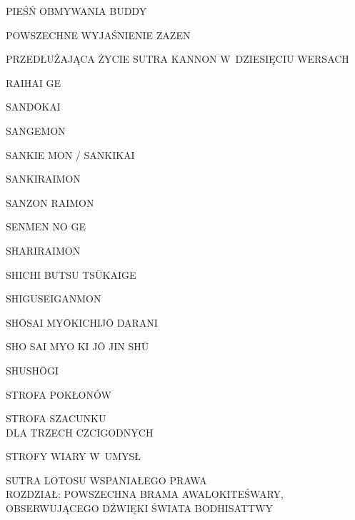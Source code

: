 \par\noindent PIEŚŃ OBMYWANIA BUDDY \dotfill \makebox[1.0cm][r]{\pageref{piesn_obmywania_buddy}}
\par\noindent POWSZECHNE WYJAŚNIENIE ZAZEN \dotfill \makebox[1.0cm][r]{\pageref{ogolne_zalecenia}}
\par\noindent PRZEDŁUŻAJĄCA ŻYCIE SUTRA KANNON W~DZIESIĘCIU WERSACH \dotfill \makebox[1.0cm][r]{\pageref{sutra_kannon}}
\par\noindent RAIHAI GE \dotfill \makebox[1.0cm][r]{\pageref{raihaige}}
\par\noindent SAND\=OKAI \dotfill \makebox[1.0cm][r]{\pageref{sandokai}}
\par\noindent SANGEMON \dotfill \makebox[1.0cm][r]{\pageref{sangemon}}
\par\noindent SANKIE MON / SANKIKAI \dotfill \makebox[1.0cm][r]{\pageref{sankiemon}}
\par\noindent SANKIRAIMON \dotfill \makebox[1.0cm][r]{\pageref{sankiraimon}}
\par\noindent SANZON RAIMON \dotfill \makebox[1.0cm][r]{\pageref{sanzonraimon}}
\par\noindent SENMEN NO GE \dotfill \makebox[1.0cm][r]{\pageref{senmen_no_ge}}
\par\noindent SHARIRAIMON \dotfill \makebox[1.0cm][r]{\pageref{shariraimon}}
\par\noindent SHICHI BUTSU TS\=UKAIGE \dotfill \makebox[1.0cm][r]{\pageref{shichi_butsu_tsukaige}}
\par\noindent SHIGUSEIGANMON \dotfill \makebox[1.0cm][r]{\pageref{shiguseiganmon}}
\par\noindent SH\=OSAI MY\=OKICHIJ\=O DARANI \dotfill \makebox[1.0cm][r]{\pageref{sio_saj_mio}}
\par\noindent SHO SAI MYO KI J\=O JIN SH\=U \dotfill \makebox[1.0cm][r]{\pageref{sho_sai_myo_ki_jo}}
\par\noindent SHUSH\=OGI \dotfill \makebox[1.0cm][r]{\pageref{shushogi}}
\par\noindent STROFA POKŁONÓW \dotfill \makebox[1.0cm][r]{\pageref{strofa_poklonow}}
\par\noindent STROFA SZACUNKU\\ DLA TRZECH CZCIGODNYCH \dotfill \makebox[1.0cm][r]{\pageref{strofa_szacunku}}
\par\noindent STROFY WIARY W~UMYSŁ \dotfill \makebox[1.0cm][r]{\pageref{strofy_wiary_w_umysl}}
\par\noindent SUTRA LOTOSU WSPANIAŁEGO PRAWA\\ROZDZIAŁ: POWSZECHNA BRAMA AWALOKITEŚWARY, OBSERWUJĄCEGO DŹWIĘKI ŚWIATA BODHISATTWY \dotfill \makebox[1.0cm][r]{\pageref{sutralotosu_powszechna_brama}}
